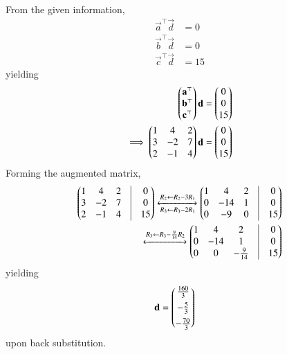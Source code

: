 From the given information, 
\begin{align}
\vec{a}^{\top}\vec{d} &= 0\\
\vec{b}^{\top}\vec{d} &= 0\\
\vec{c}^{\top}\vec{d} &= 15
\end{align}
yielding
\begin{align}
\begin{pmatrix}\mathbf{a}^{\top} \\\mathbf{b}^{\top}\\\mathbf{c}^{\top}\end{pmatrix}\mathbf{d} &= \begin{pmatrix}0\\0\\15\end{pmatrix}\\
\implies \begin{pmatrix}1&4&2 \\3&-2&7 \\2&-1&4\end{pmatrix}\mathbf{d} &= \begin{pmatrix}0\\0\\15\end{pmatrix}
\label{eq:chapters/12/10/5/12/1}
\end{align}
%
Forming the augmented matrix, 
\begin{align}
	\myvec{1&4&2&\vrule&0\\ 3&-2&7&\vrule&0 \\ 2&-1&4&\vrule&15} 
	\xleftrightarrow[R_3\leftarrow R_3-2R_1]{R_2\leftarrow R_2-3R_1}
	\myvec{1&4&2&\vrule&0\\ 0&-14&1&\vrule&0 \\ 0&-9&0&\vrule&15}
\nonumber	\\
	\xleftrightarrow[]{R_3\leftarrow R_3-\frac{9}{14}R_2}
	\myvec{1&4&2&\vrule&0\\ 0&-14&1&\vrule&0 \\ 0&0&-\frac{9}{14}&\vrule&15}
	\label{eq:chapters/12/10/5/12/2}
\end{align}
yielding
%
\begin{align}
	\mathbf{d} &= \begin{pmatrix}\frac{160}{3}\\[1ex]-\frac{5}{3}\\[1ex]-\frac{70}{3}\end{pmatrix}
\end{align}
upon back substitution.


